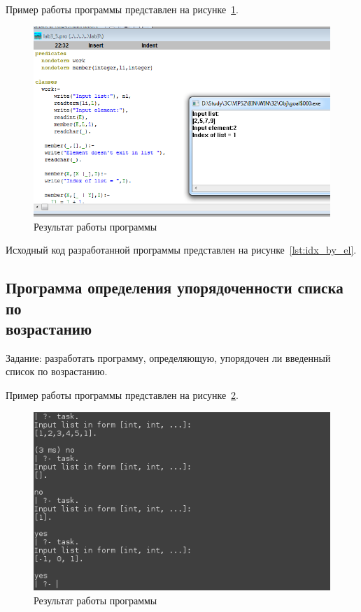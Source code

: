 Пример работы программы представлен на рисунке~\ref{fig:idx_by_el}.

\begin{figure}[h!]
  \centering
  \includegraphics[width=150mm]{img/idx_by_el}
  \caption{Результат работы программы}
  \label{fig:idx_by_el}
\end{figure}

Исходный код разработанной программы представлен на
рисунке~\ref{lst:idx_by_el}.

\pagebreak




\subsection{Программа определения упорядоченности списка по \\ возрастанию}

Задание: разработать программу, определяющую,
упорядочен ли введенный список по возрастанию.

Пример работы программы представлен на рисунке~\ref{fig:is_growing}.

\begin{figure}[h!]
  \centering
  \includegraphics[width=120mm]{img/is_growing}
  \caption{Результат работы программы}
  \label{fig:is_growing}
\end{figure}

